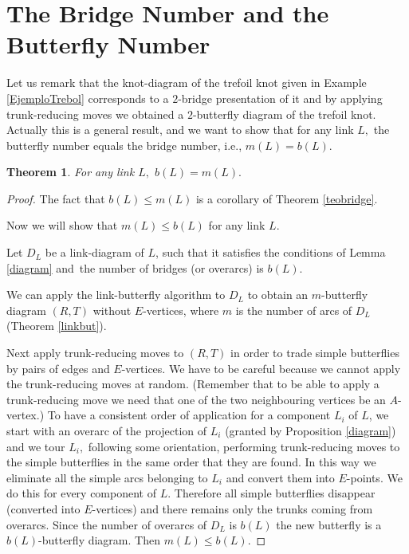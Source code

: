 \documentclass{amsproc}\usepackage{eurosym}
\theoremstyle{plain}
\newtheorem{theorem}{Theorem}
\numberwithin{equation}{section}
\begin{document}
\section{\label{number}The Bridge Number and the Butterfly Number}

Let us remark that the knot-diagram of the trefoil knot given in Example
\ref{EjemploTrebol} corresponds to a $2$-bridge presentation of it and by
applying trunk-reducing moves we obtained a $2$-butterfly diagram of the
trefoil knot. Actually this is a general result, and we want to show that for
any link $L,$ the butterfly number equals the bridge number, i.e., $m(L)=b(L)$.

\begin{theorem}
\label{TeoremaBridgeigualmariposa}For any link $L,$ $b(L)=m(L).$
\end{theorem}

\begin{proof}
The fact that $b(L)\leq m(L)$ is a corollary of Theorem \ref{teobridge}.

Now we will show that $m(L)\leq b(L)$ for any link $L.$

Let $D_{L}$ be a link-diagram of $L$, such that it satisfies the conditions of
Lemma \ref{diagram} and\ the number of bridges (or overarcs) is $b(L)$.

We can apply the link-butterfly algorithm to $D_{L}$ to obtain an
$m$-butterfly diagram $\left(  R,T\right)  $ without $E$-vertices, where $m$
is the number of arcs of $D_{L}$ (Theorem \ref{linkbut}).

Next apply trunk-reducing moves to $\left(  R,T\right)  $ in order to trade
simple butterflies by pairs of edges and $E$-vertices. We have to be careful
because we cannot apply the trunk-reducing moves at random. (Remember that to
be able to apply a trunk-reducing move we need that one of the two
neighbouring vertices be an $A$-vertex.) To have a consistent order of
application for a component $L_{i}$ of $L$, we start with an overarc of the
projection of $L_{i}$ (granted by Proposition \ref{diagram}) and we tour
$L_{i},$ following some orientation, performing trunk-reducing moves to the
simple butterflies in the same order that they are found. In this way we
eliminate all the simple arcs belonging to $L_{i}$ and convert them into
$E$-points. We do this for every component of $L.$ Therefore all simple
butterflies disappear (converted into $E$-vertices) and there remains only the
trunks coming from overarcs. Since the number of overarcs of $D_{L}$ is $b(L)$
the new butterfly is a $b(L)$-butterfly diagram. Then $m(L)\leq b(L).$
\end{proof}
\end{document}
